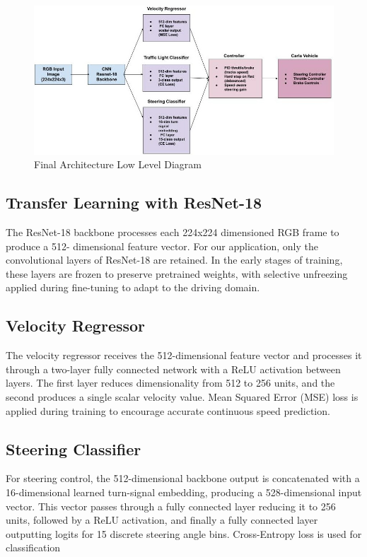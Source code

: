 \documentclass{article} %
\begin{document}
\begin{figure}[H] %
    \centering
    \includegraphics[width=1.0\textwidth]{GoogleDrawingPrimaryArchyDiagram.jpg} %
    \caption{Final Architecture Low Level Diagram}
    \label{fig:GoogleDrawingPrimaryArchyDiagram}
\end{figure}

\subsection{Transfer Learning with ResNet-18}

The ResNet-18 backbone processes each 224x224 dimensioned RGB frame to produce a 512- dimensional feature vector. 
For our application, only the convolutional layers of ResNet-18 are retained. In the early stages of training, these layers are frozen to preserve pretrained weights, with selective unfreezing applied during fine-tuning to adapt to the driving domain.

\subsection{Velocity Regressor}
The velocity regressor receives the 512-dimensional feature vector and processes it through a two-layer fully connected network with a ReLU activation between layers. 
The first layer reduces dimensionality from 512 to 256 units, and the second produces a single scalar velocity value. Mean Squared Error (MSE) 
loss is applied during training to encourage accurate continuous speed prediction.

\subsection{Steering Classifier}
For steering control, the 512-dimensional backbone output is concatenated with a 16-dimensional learned turn-signal embedding, producing a 528-dimensional input vector. 
This vector passes through a fully connected layer reducing it to 256 units, followed by a ReLU activation, and finally a fully connected layer outputting logits for 15 discrete steering angle bins. 
Cross-Entropy loss is used for classification
\end{document}
